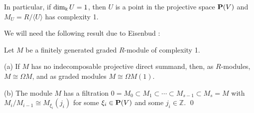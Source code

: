 \documentclass[10pt]{amsart}
\begin{document}
%



\noindent In particular, if  $\operatorname{dim}\nolimits_{\Bbbk} U = 1$, then $U$ is a point in the projective space  ${\bf P}(V)$ and  $M_U = R/\langle U\rangle$ has 
complexity 1. 

\medskip
\noindent We will  need the following result due to Eisenbud \cite{E}:
\begin{thm}\label{Eis} Let $M$ be a finitely generated  graded $R$-module of complexity 1. 
\item[(a)] If $M$ has no indecomposable projective direct summand, then, as $R$-modules, $M\cong \Omega M$, 
and as graded modules $M\cong\Omega M(1)$.
\item [(b)] The module $M$ has a filtration 
$0=M_0\subset M_1\subset \cdots \subset M_{s-1}\subset M_s =M$
with $M_i/M_{i-1} \cong  M_{\xi_i}(j_i)$ for some $\xi_i \in {\bf P}(V)$ and some $j_i\in \mathbb Z$.
 \qed
\end{thm}
\medskip
\end{document}
